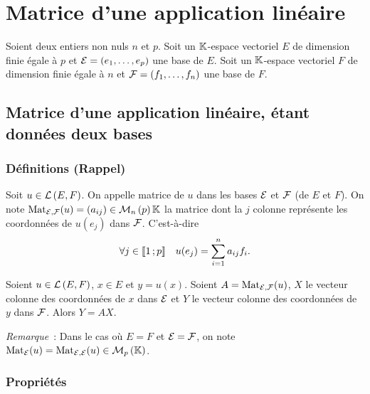 \section{Matrice d'une application linéaire}

Soient deux entiers non nuls \(n\) et \(p\). Soit un \(\mathbb{K}\)-espace vectoriel \(E\) de dimension finie égale à \(p\) et \(\mathcal{E}=(e_1,\ldots,e_p)\) une base de \(E\). Soit un \(\mathbb{K}\)-espace vectoriel \(F\) de dimension finie égale à \(n\) et \(\mathcal{F}=(f_1,\ldots,f_n)\) une base de \(F\).

\subsection{Matrice d'une application linéaire, étant données deux bases}

\subsubsection{Définitions (Rappel)}

Soit \(u \in \mathcal{L}\left(E,F\right)\). On appelle matrice de \(u\) dans les bases \(\mathcal{E}\) et \(\mathcal{F}\) (de \(E\) et \(F\)). On note \(\mathrm{Mat}_{\mathcal{E},\mathcal{F}}(u)=(a_{ij})\in\mathcal{M}_{n}\left(p\right){\mathbb{K}}\) la matrice dont la \(j\)\ieme{} colonne représente les coordonnées de \(u(e_j)\) dans \(\mathcal{F}\). C'est-à-dire
\begin{equation}
  \forall j \in \mathopen{\llbracket}1\mathclose{}\mathpunct{};p\mathclose{\rrbracket} \quad u(e_j) = \sum_{i=1}^n a_{ij} f_i.
\end{equation}

\begin{prop}
  Soient \(u \in \mathcal{L}\left(E,F\right)\), \(x \in E\) et \(y=u(x)\). Soient \(A=\mathrm{Mat}_{\mathcal{E},\mathcal{F}}(u)\), \(X\) le vecteur colonne des coordonnées de \(x\) dans \(\mathcal{E}\) et \(Y\) le vecteur colonne des coordonnées de \(y\) dans \(\mathcal{F}\). Alors \(Y=AX\).
\end{prop}

\emph{Remarque}~: Dans le cas où \(E=F\) et \(\mathcal{E}=\mathcal{F}\), on note \(\mathrm{Mat}_{\mathcal{E}}(u)=\mathrm{Mat}_{\mathcal{E},\mathcal{E}}(u) \in \mathcal{M}_{p}\left(\mathbb{K}\right)\).

\subsubsection{Propriétés}

